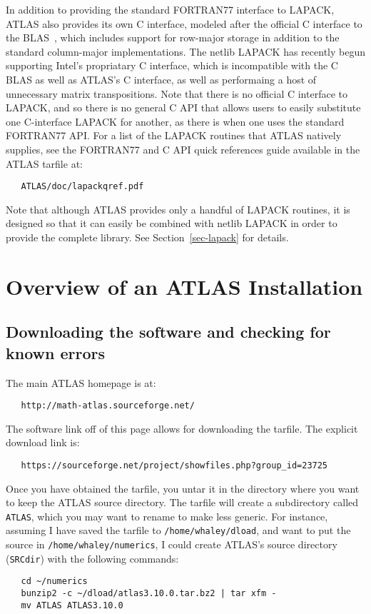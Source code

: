 \documentclass[11pt]{article}
\begin{document}
In addition to providing the standard FORTRAN77 interface to LAPACK,
ATLAS also provides its own C interface, modeled after the official C interface
to the BLAS~\cite{Blast,blast-toms}, which includes support for row-major
storage in addition to the standard column-major implementations.  
The netlib LAPACK has recently begun supporting Intel's propriatary C
interface, which is incompatible with the C BLAS as well as ATLAS's C
interface, as well as performaing a host of unnecessary matrix transpositions.
Note that
there is no official C interface to LAPACK, and so there is no general C
API that allows users to easily substitute one C-interface LAPACK for
another, as there is when one uses the standard FORTRAN77 API. 
For a list of the LAPACK routines that ATLAS natively supplies, see the 
FORTRAN77 and C API quick references guide available in the ATLAS tarfile at:
\begin{verbatim}
   ATLAS/doc/lapackqref.pdf
\end{verbatim}

Note that although ATLAS provides only a handful of LAPACK routines, it is
designed so that it can easily be combined with netlib LAPACK in order
to provide the complete library.  See Section~\ref{sec-lapack} for details.

\section{Overview of an ATLAS Installation}
\label{sec-install}

\subsection{Downloading the software and checking for known errors}
The main ATLAS homepage is at:
\vspace*{-0.1in}
\begin{verbatim}
   http://math-atlas.sourceforge.net/
\end{verbatim}

The software link off of this page allows for downloading the tarfile.
The explicit download link is:
\vspace*{-0.1in}
\begin{verbatim}
   https://sourceforge.net/project/showfiles.php?group_id=23725
\end{verbatim}

Once you have obtained the tarfile, you untar it in the directory where
you want to keep the ATLAS source directory.  The tarfile will create
a subdirectory called {\tt ATLAS}, which you may want to rename to make
less generic.  For instance, assuming I have saved the tarfile to
{\tt /home/whaley/dload}, and want to put the source in 
{\tt /home/whaley/numerics}, I could create ATLAS's source directory
({\tt SRCdir}) with the following commands:
\begin{verbatim}
   cd ~/numerics
   bunzip2 -c ~/dload/atlas3.10.0.tar.bz2 | tar xfm -
   mv ATLAS ATLAS3.10.0
\end{verbatim}
\end{document}
